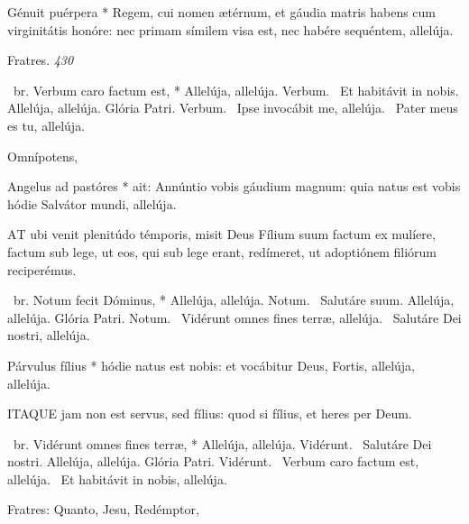 

 Génuit puérpera * Regem, cui nomen ætérnum, et gáudia matris habens cum virginitátis honóre: nec primam símilem visa est, nec habére sequéntem, allelúja.

 Fratres. \textit{430}

\R\ br. Verbum caro factum est, * Allelúja, allelúja. Verbum. \V\ Et habitávit in nobis. Allelúja, allelúja. Glória Patri. Verbum. \V\ Ipse invocábit me, allelúja. \R\ Pater meus es tu, allelúja.

 Omnípotens, 


 Angelus ad pastóres * ait: Annúntio vobis gáudium magnum: quia natus est vobis hódie Salvátor mundi, allelúja.


\lettrine[lines=2]{A}{T} ubi venit plenitúdo témporis, misit Deus Fílium suum factum ex mulíere, factum sub lege, ut eos, qui sub lege erant, redímeret, ut adoptiónem filiórum reciperémus.

\R\ br. Notum fecit Dóminus, * Allelúja, allelúja. Notum. \V\ Salutáre suum. Allelúja, allelúja. Glória Patri. Notum. \V\ Vidérunt omnes fines terræ, allelúja. \R\ Salutáre Dei nostri, allelúja.


 Párvulus fílius * hódie natus est nobis: et vocábitur Deus, Fortis, allelúja, allelúja.


\lettrine[lines=2]{I}{TAQUE} jam non est servus, sed fílius: quod si fílius, et heres per Deum.

\R\ br. Vidérunt omnes fines terræ, * Allelúja, allelúja. Vidérunt. \V\ Salutáre Dei nostri. Allelúja, allelúja. Glória Patri. Vidérunt. \V\ Verbum caro factum est, allelúja. \R\ Et habitávit in nobis, allelúja.



 Fratres: Quanto,  Jesu, Redémptor, 

